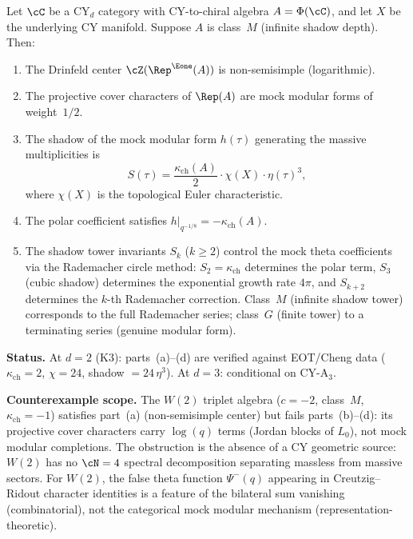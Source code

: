 \begin{conjecture}
\label{conj:cy-mock-modular-mechanism}
\ClaimStatusConjectured\quad
Let $\cC$ be a CY$_d$ category with CY-to-chiral algebra $A = \Phi(\cC)$, and let $X$ be the underlying CY manifold. Suppose $A$ is class~$M$ (infinite shadow depth). Then:
\begin{enumerate}[label=\textup{(\alph*)}]
\item The Drinfeld center $\cZ(\Rep^{\Eone}(A))$ is non-semisimple (logarithmic).
\item The projective cover characters of $\Rep(A)$ are mock modular forms of weight~$1/2$.
\item The shadow of the mock modular form $h(\tau)$ generating the massive multiplicities is
\begin{equation}\label{eq:cy-mock-shadow-formula}
S(\tau) = \frac{\kappa_{\mathrm{ch}}(A)}{2} \cdot \chi(X) \cdot \eta(\tau)^3,
\end{equation}
where $\chi(X)$ is the topological Euler characteristic.
\item The polar coefficient satisfies $h|_{q^{-1/8}} = -\kappa_{\mathrm{ch}}(A)$.
\item The shadow tower invariants $S_k$ ($k \geq 2$) control the mock theta coefficients via the Rademacher circle method: $S_2 = \kappa_{\mathrm{ch}}$ determines the polar term, $S_3$ (cubic shadow) determines the exponential growth rate $4\pi$, and $S_{k+2}$ determines the $k$-th Rademacher correction. Class~$M$ (infinite shadow tower) corresponds to the full Rademacher series; class~$G$ (finite tower) to a terminating series (genuine modular form).
\end{enumerate}
\textbf{Status.} At $d = 2$ (K3): parts~(a)--(d) are verified against EOT/Cheng data ($\kappa_{\mathrm{ch}} = 2$, $\chi = 24$, shadow $= 24\,\eta^3$). At $d = 3$: conditional on CY-A$_3$.

\medskip\noindent
\textbf{Counterexample scope.} The $W(2)$ triplet algebra ($c = -2$, class~$M$, $\kappa_{\mathrm{ch}} = -1$) satisfies part~(a) (non-semisimple center) but fails parts~(b)--(d): its projective cover characters carry $\log(q)$ terms (Jordan blocks of $L_0$), not mock modular completions. The obstruction is the absence of a CY geometric source: $W(2)$ has no $\cN = 4$ spectral decomposition separating massless from massive sectors. For $W(2)$, the false theta function $\Psi^{-}(q)$ appearing in Creutzig--Ridout character identities is a feature of the bilateral sum vanishing (combinatorial), not the categorical mock modular mechanism (representation-theoretic).
\end{conjecture}

